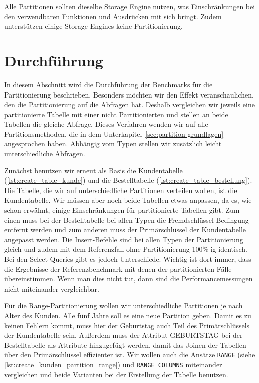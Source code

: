 Alle Partitionen sollten dieselbe Storage Engine nutzen, was Einschränkungen bei den verwendbaren Funktionen und Ausdrücken mit sich bringt.
Zudem unterstützen einige Storage Engines keine Partitionierung.

\section{Durchführung}\label{sec:partition-durchfuhrung}
In diesem Abschnitt wird die Durchführung der Benchmarks für die Partitionierung beschrieben.
Besonders möchten wir den Effekt veranschaulichen, den die Partitionierung auf die Abfragen hat.
Deshalb vergleichen wir jeweils eine partitionierte Tabelle mit einer nicht Partitionierten und stellen an beide Tabellen die gleiche Abfrage.
Dieses Verfahren wenden wir auf alle Partitionsmethoden, die in dem Unterkapitel~\ref{sec:partition-grundlagen} angesprochen haben.
Abhängig vom Typen stellen wir zusätzlich leicht unterschiedliche Abfragen.

Zunächst benutzen wir erneut als Basis die Kundentabelle (\ref{lst:create_table_kunde}) und die Bestelltabelle (\ref{lst:create_table_bestellung}).
Die Tabelle, die wir auf unterschiedliche Partitionen verteilen wollen, ist die Kundentabelle.
Wir müssen aber noch beide Tabellen etwas anpassen, da es, wie schon erwähnt, einige Einschränkungen für partitionierte Tabellen gibt.
Zum einen muss bei der Bestelltabelle bei allen Typen die Fremdschlüssel-Bedingung entfernt werden und zum anderen muss der Primärschlüssel der Kundentabelle angepasst werden.
Die Insert-Befehle sind bei allen Typen der Partitionierung gleich und zudem mit dem Referenzfall ohne Partitionierung 100\%-ig identisch.
Bei den Select-Queries gibt es jedoch Unterschiede.
Wichtig ist dort immer, dass die Ergebnisse der Referenzbenchmark mit denen der partitionierten Fälle übereinstimmen.
Wenn man dies nicht tut, dann sind die Performancemessungen nicht miteinander vergleichbar.

Für die Range-Partitionierung wollen wir unterschiedliche Partitionen je nach Alter des Kunden.
Alle fünf Jahre soll es eine neue Partition geben.
Damit es zu keinen Fehlern kommt, muss hier der Geburtstag auch Teil des Primärschlüssels der Kundentabelle sein.
Außerdem muss der Attribut GEBURTSTAG bei der Bestelltabelle als Attribute hinzugefügt werden, damit das Joinen der Tabellen über den Primärschlüssel effizienter ist.
Wir wollen auch die Ansätze \texttt{RANGE} (siehe \ref{lst:create_kunden_partition_range}) und \texttt{RANGE COLUMNS} miteinander vergleichen und beide Varianten bei der Erstellung der Tabelle benutzen.

